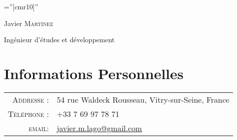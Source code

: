 \documentclass[a4paper,10pt]{article}
\begin{document}

\pagestyle{empty} %

\font\fb=''[cmr10]'' %

\par{\centering
		{\Huge Javier \textsc{Martínez}
		\par\large{Ingénieur d'études et développement}
	}\bigskip\par}

\section{Informations Personnelles}

\begin{tabular}{rl}
 
    \textsc{Addresse :}   & 54 rue Waldeck Rousseau, Vitry-sur-Seine, France \\
    \textsc{Téléphone :}     & +33 7 69 97 78 71\\
    \textsc{email:}     & \href{mailto:javier.m.lago@gmail.com}{javier.m.lago@gmail.com}
\end{tabular}

\end{document}
